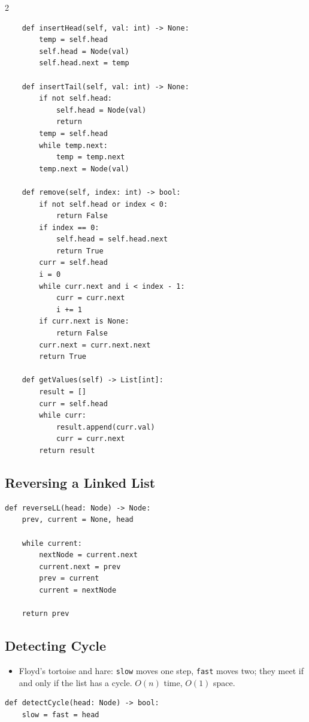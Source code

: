\documentclass[9pt,a4paper]{extarticle}
\newlength{\tw}
\begin{document}
\begin{multicols}{2}
\begin{lstlisting}
    def insertHead(self, val: int) -> None:
        temp = self.head
        self.head = Node(val)
        self.head.next = temp

    def insertTail(self, val: int) -> None:
        if not self.head:
            self.head = Node(val)
            return
        temp = self.head
        while temp.next:
            temp = temp.next
        temp.next = Node(val)

    def remove(self, index: int) -> bool:
        if not self.head or index < 0:
            return False
        if index == 0:
            self.head = self.head.next
            return True
        curr = self.head
        i = 0
        while curr.next and i < index - 1:
            curr = curr.next
            i += 1
        if curr.next is None:
            return False
        curr.next = curr.next.next
        return True

    def getValues(self) -> List[int]:
        result = []
        curr = self.head
        while curr:
            result.append(curr.val)
            curr = curr.next
        return result
\end{lstlisting}

\subsection{Reversing a Linked List}

\begin{lstlisting}
def reverseLL(head: Node) -> Node:
    prev, current = None, head

    while current:
        nextNode = current.next
        current.next = prev
        prev = current
        current = nextNode

    return prev
\end{lstlisting}

\subsection{Detecting Cycle}

\begin{itemize}
\item Floyd's tortoise and hare: \texttt{slow} moves one step, \texttt{fast} moves two; they meet if and only if the list has a cycle. $O(n)$ time, $O(1)$ space.
\end{itemize}

\begin{lstlisting}
def detectCycle(head: Node) -> bool:
    slow = fast = head


\end{lstlisting}
\end{multicols}
\end{document}
